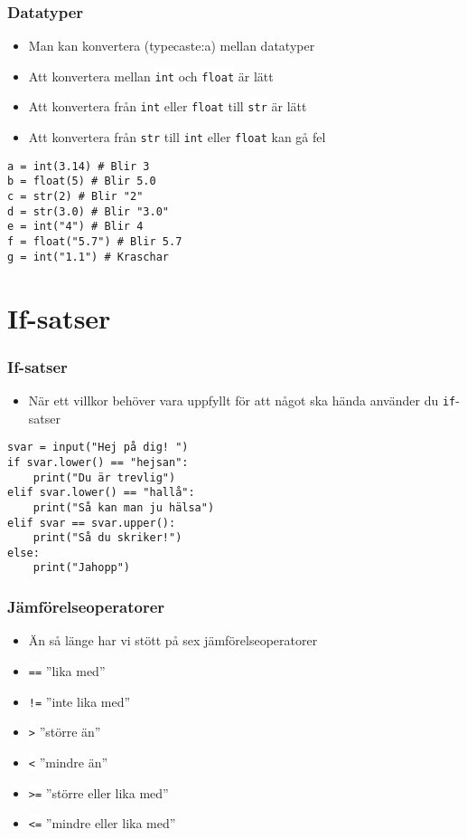 \documentclass[aspectratio=169]{beamer}
\newcommand{\code}[1]{\colorbox{white}{\lstinline{#1}}}
\begin{document}
\begin{frame}[fragile]
	\frametitle{Datatyper}
	
	\begin{itemize}
		\item Man kan konvertera (typecaste:a) mellan datatyper
		\item Att konvertera mellan \code{int} och \code{float} är lätt
		\item Att konvertera från \code{int} eller \code{float} till \code{str} är lätt
		\item Att konvertera från \code{str} till \code{int} eller \code{float} kan gå fel
	\end{itemize}
	
	\begin{lstlisting}
a = int(3.14) # Blir 3
b = float(5) # Blir 5.0
c = str(2) # Blir "2"
d = str(3.0) # Blir "3.0"
e = int("4") # Blir 4
f = float("5.7") # Blir 5.7
g = int("1.1") # Kraschar  
	\end{lstlisting}
	
\end{frame}

\section{If-satser}

\begin{frame}[fragile]
	\frametitle{If-satser}
	
	\begin{itemize}
		\item När ett villkor behöver vara uppfyllt för att något ska hända använder du \code{if}-satser
	\end{itemize}
	
	\begin{lstlisting}
svar = input("Hej på dig! ")
if svar.lower() == "hejsan":
    print("Du är trevlig")
elif svar.lower() == "hallå":
    print("Så kan man ju hälsa")
elif svar == svar.upper():
    print("Så du skriker!")
else:
    print("Jahopp")
	\end{lstlisting}
	
\end{frame}

\begin{frame}
	\frametitle{Jämförelseoperatorer}
	
	\begin{itemize}
		\item Än så länge har vi stött på sex jämförelseoperatorer
		\item \code{==} ''lika med''
		\item \code{!=} ''inte lika med''
		\item \code{>} ''större än''
		\item \code{<} ''mindre än''
		\item \code{>=} ''större eller lika med''
		\item \code{<=} ''mindre eller lika med''
	\end{itemize}
	
\end{frame}
\end{document}
